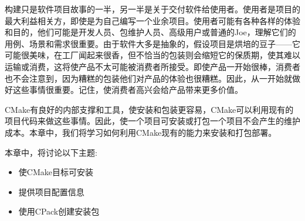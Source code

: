 构建只是软件项目故事的一半，另一半是关于交付软件给使用者。使用者是项目的最大利益相关方，即使是为自己编写一个业余项目。使用者可能有各种各样的体验和目的，他们可能是开发人员、包维护人员、高级用户或普通的Joe，理解它们的用例、场景和需求很重要。由于软件大多是抽象的，假设项目是烘培的豆子——它可能很美味，在工厂闻起来很香，但不恰当的包装则会缩短它的保质期，使其难以运输或消费，这将使产品不太可能被消费者所接受。即使产品一开始很棒，消费者也不会注意到，因为糟糕的包装他们对产品的体验也很糟糕。因此，从一开始就做好这些事情很重要。记住，使消费者高兴会给产品带来更多价值。

CMake有良好的内部支撑和工具，使安装和包装更容易，CMake可以利用现有的项目代码来做这些事情。因此，使一个项目可安装或打包一个项目不会产生的维护成本。本章中，我们将学习如何利用CMake现有的能力来安装和打包部署。

本章中，将讨论以下主题:

\begin{itemize}
\item 
使CMake目标可安装

\item 
提供项目配置信息

\item 
使用CPack创建安装包
\end{itemize}
